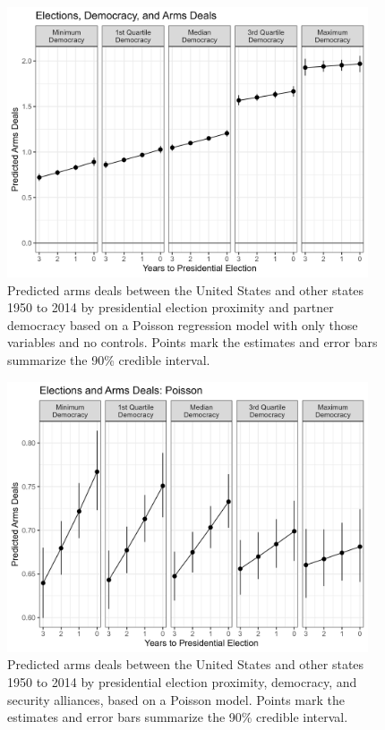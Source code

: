\documentclass[12pt]{article}
\begin{document}
\begin{figure}[htpb]
	\centering
		\includegraphics[width=0.95\textwidth]{nocont-deals-pred.png}
	\caption{Predicted arms deals between the United States and other states 1950 to 2014 by presidential election proximity and partner democracy based on a Poisson regression model with only those variables and no controls. Points mark the estimates and error bars summarize the 90\% credible interval.}
	\label{fig:deals-pred-nocont}
\end{figure}



\begin{figure}[htpb]
	\centering
		\includegraphics[width=0.95\textwidth]{deals-pred-pois.png}
	\caption{Predicted arms deals between the United States and other states 1950 to 2014 by presidential election proximity, democracy, and security alliances, based on a Poisson model. Points mark the estimates and error bars summarize the 90\% credible interval.}
	\label{fig:deals-pred-pois}
\end{figure}
\end{document}
